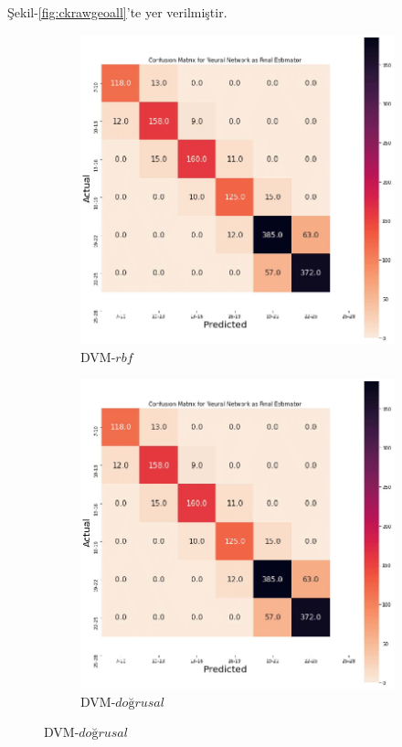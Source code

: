 \lipsum[4] 
Şekil-\ref{fig:ckrawgeoall}'te yer verilmiştir.



\begin{figure}[hbt!]

\begin{subfigure}{.475\linewidth}
  \includegraphics[trim={0 0 0 0.72cm},clip,width=\linewidth]{gorseller/Confusion-Matrix.png}
  \caption{DVM-$rbf$}
  \label{MLEDdet1}
\end{subfigure}\hfill %
\begin{subfigure}{.475\linewidth}
  \includegraphics[trim={0 0 0 0.72cm},clip,width=\linewidth]{gorseller/Confusion-Matrix.png}
  \caption{DVM-$\textit{doğrusal}$}
  \label{energydetPSK1}
\end{subfigure}


\end{figure}
